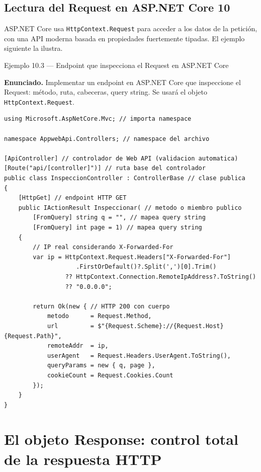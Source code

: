 \subsection{Lectura del Request en ASP.NET Core 10}

ASP.NET Core usa \texttt{HttpContext.Request} para acceder a
los datos de la petición, con una API moderna basada en propiedades
fuertemente tipadas. El ejemplo siguiente la ilustra.


\begin{cajaejemplo}{Ejemplo 10.3 --- Endpoint que inspecciona el Request en ASP.NET Core}

\textbf{Enunciado.} Implementar un endpoint en ASP.NET Core que inspeccione el Request: método, ruta, cabeceras, query string. Se usará el objeto \texttt{HttpContext.Request}.

\begin{lstlisting}[style=cs,caption={Controllers/InspeccionController.cs},label=lst:10.6]
using Microsoft.AspNetCore.Mvc; // importa namespace

namespace AppwebApi.Controllers; // namespace del archivo

[ApiController] // controlador de Web API (validacion automatica)
[Route("api/[controller]")] // ruta base del controlador
public class InspeccionController : ControllerBase // clase publica
{
    [HttpGet] // endpoint HTTP GET
    public IActionResult Inspeccionar( // metodo o miembro publico
        [FromQuery] string q = "", // mapea query string
        [FromQuery] int page = 1) // mapea query string
    {
        // IP real considerando X-Forwarded-For
        var ip = HttpContext.Request.Headers["X-Forwarded-For"]
                    .FirstOrDefault()?.Split(',')[0].Trim()
                 ?? HttpContext.Connection.RemoteIpAddress?.ToString()
                 ?? "0.0.0.0";

        return Ok(new { // HTTP 200 con cuerpo
            metodo      = Request.Method,
            url         = $"{Request.Scheme}://{Request.Host}{Request.Path}",
            remoteAddr  = ip,
            userAgent   = Request.Headers.UserAgent.ToString(),
            queryParams = new { q, page },
            cookieCount = Request.Cookies.Count
        });
    }
}
\end{lstlisting}
\end{cajaejemplo}

\section{El objeto Response: control total de la respuesta HTTP}

